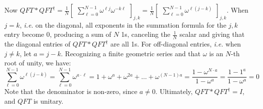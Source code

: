Now $QFT*QFT^\dagger=\frac{1}{N}\begin{bmatrix}\sum_{\ell=0}^{N-1} \omega^{\ell j}\omega^{-k\ell}\end{bmatrix}_{j,k} =\frac{1}{N} \begin{bmatrix}\sum_{\ell=0}^{N-1} \omega^{\ell (j-k)}\end{bmatrix}_{j,k}$.  When $j=k$, \textit{i.e.} on the diagonal, all exponents in the summation formula for the $j,k$ entry become 0, producing a sum of $N$ 1s, canceling the $\frac{1}{N}$ scalar and giving that the diagonal entries of $QFT*QFT^\dagger$ are all 1s.  For off-diagonal entries, \textit{i.e.} when $j\neq k$, let $a=j-k$.  Recognizing a finite geometric series and that $\omega$ is an $N$-th root of unity, we have:
$$\sum_{\ell=0}^{N-1} \omega^{\ell (j-k)} = \sum_{\ell=0}^{N-1} \omega^{a\cdot\ell} = 1+\omega^a+\omega^{2a}+\ldots+\omega^{(N-1)a} = \frac{1-\omega^{N\cdot a}}{1-\omega^a} = \frac{1-1^a}{1-\omega^a}= 0$$
Note that the denominator is non-zero, since $a\neq 0$.  Ultimately, $QFT*QFT^\dagger=I$, and $QFT$ is unitary.

